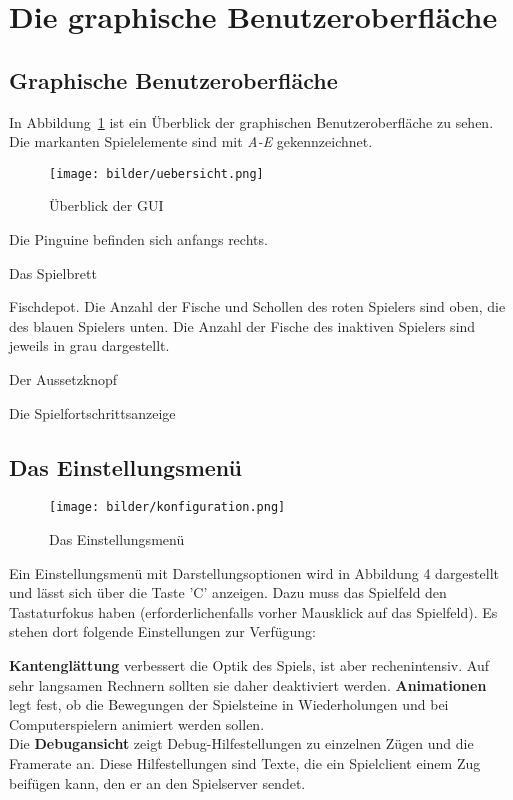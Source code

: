 \documentclass[a4paper, ngerman]{scrartcl}
\begin{document}
\section{Die graphische Benutzeroberfläche}
\subsection{Graphische Benutzeroberfläche}
	In Abbildung~\ref{fig:GUI} ist ein Überblick der graphischen Benutzeroberfläche
	zu sehen. Die markanten Spielelemente sind mit \emph{A-E} gekennzeichnet.
	
	 \begin{figure}[h!]
		\centering		
		\texttt{[image: bilder/uebersicht.png]} 
		\caption{Überblick der GUI}
		\label{fig:GUI}
	\end{figure} 
\begin{compactenum}[A)] 
\item Die Pinguine befinden sich anfangs rechts.
\item Das Spielbrett  
\item Fischdepot.
 Die Anzahl der Fische und Schollen des roten Spielers sind 
oben, die des blauen Spielers unten. Die Anzahl der Fische des inaktiven
Spielers sind jeweils in grau dargestellt.
\item Der Aussetzknopf
\item  Die Spielfortschrittsanzeige
	\end{compactenum}
	
\subsection{Das Einstellungsmenü} 
	 \begin{figure}[h!]
		\centering
		\texttt{[image: bilder/konfiguration.png]}
		\caption{Das Einstellungsmenü}
		\label{fig:Configuration}
	\end{figure}
	
	Ein Einstellungsmenü mit Darstellungsoptionen wird in Abbildung 4 dargestellt
	und lässt sich über die Taste 'C' anzeigen. Dazu muss das
Spielfeld den Tastaturfokus haben (erforderlichenfalls
vorher Mausklick auf das Spielfeld). Es stehen dort
folgende Einstellungen zur Verfügung: 

\textbf{Kantenglättung} verbessert die Optik des
Spiels, ist aber rechenintensiv. Auf sehr langsamen Rechnern sollten sie daher
deaktiviert werden.
\textbf{Animationen} legt fest, ob die Bewegungen der Spielsteine in
Wiederholungen und bei Computerspielern animiert werden sollen.\\
Die \textbf{Debugansicht} zeigt Debug-Hilfestellungen zu einzelnen Zügen und
die Framerate an.
Diese Hilfestellungen sind Texte, die ein Spielclient einem Zug beifügen kann, den er
an den Spielserver sendet.
	
\end{document}
